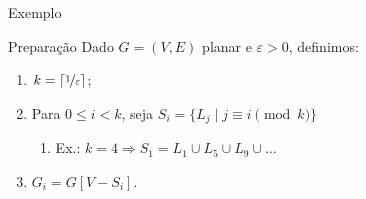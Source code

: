 \begin{frame}{Exemplo}
    \begin{minipage}{\linewidth}
        \centering
    \end{minipage}
\end{frame}

\begin{frame}{Preparação}
    Dado $G=(V, E)$ planar e $\varepsilon > 0$, definimos:
    \pause
    \begin{enumerate}[-]
        \item $k=\lceil\nicefrac{1}{\varepsilon}\rceil$;
        \item Para $0 \le i < k$, seja $S_i = \{L_j \mid j \equiv i \pmod k\}$
        \begin{enumerate}[-]
            \item Ex.: $k = 4 \Rightarrow S_1 = L_1 \cup L_5 \cup L_9 \cup \dots$
        \end{enumerate}
        \item $G_i = G[V - S_i]$.
    \end{enumerate}
\end{frame}

